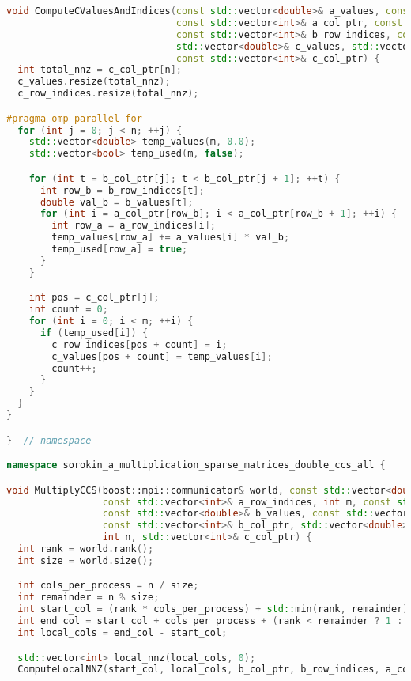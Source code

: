 \documentclass[12pt]{article}
\begin{document}
\begin{lstlisting}[language=C++]
void ComputeCValuesAndIndices(const std::vector<double>& a_values, const std::vector<int>& a_row_indices,
                              const std::vector<int>& a_col_ptr, const std::vector<double>& b_values,
                              const std::vector<int>& b_row_indices, const std::vector<int>& b_col_ptr, int m, int n,
                              std::vector<double>& c_values, std::vector<int>& c_row_indices,
                              const std::vector<int>& c_col_ptr) {
  int total_nnz = c_col_ptr[n];
  c_values.resize(total_nnz);
  c_row_indices.resize(total_nnz);

#pragma omp parallel for
  for (int j = 0; j < n; ++j) {
    std::vector<double> temp_values(m, 0.0);
    std::vector<bool> temp_used(m, false);

    for (int t = b_col_ptr[j]; t < b_col_ptr[j + 1]; ++t) {
      int row_b = b_row_indices[t];
      double val_b = b_values[t];
      for (int i = a_col_ptr[row_b]; i < a_col_ptr[row_b + 1]; ++i) {
        int row_a = a_row_indices[i];
        temp_values[row_a] += a_values[i] * val_b;
        temp_used[row_a] = true;
      }
    }

    int pos = c_col_ptr[j];
    int count = 0;
    for (int i = 0; i < m; ++i) {
      if (temp_used[i]) {
        c_row_indices[pos + count] = i;
        c_values[pos + count] = temp_values[i];
        count++;
      }
    }
  }
}

}  // namespace

namespace sorokin_a_multiplication_sparse_matrices_double_ccs_all {

void MultiplyCCS(boost::mpi::communicator& world, const std::vector<double>& a_values,
                 const std::vector<int>& a_row_indices, int m, const std::vector<int>& a_col_ptr,
                 const std::vector<double>& b_values, const std::vector<int>& b_row_indices, int k,
                 const std::vector<int>& b_col_ptr, std::vector<double>& c_values, std::vector<int>& c_row_indices,
                 int n, std::vector<int>& c_col_ptr) {
  int rank = world.rank();
  int size = world.size();

  int cols_per_process = n / size;
  int remainder = n % size;
  int start_col = (rank * cols_per_process) + std::min(rank, remainder);
  int end_col = start_col + cols_per_process + (rank < remainder ? 1 : 0);
  int local_cols = end_col - start_col;

  std::vector<int> local_nnz(local_cols, 0);
  ComputeLocalNNZ(start_col, local_cols, b_col_ptr, b_row_indices, a_col_ptr, a_row_indices, m, local_nnz);


\end{lstlisting}
\end{document}
